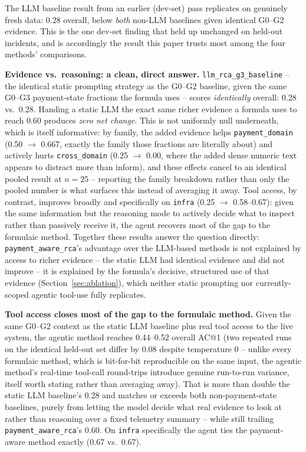 \documentclass[conference]{IEEEtran}
\begin{document}
The LLM baseline result from an earlier (dev-set) pass replicates on
genuinely fresh data: 0.28 overall, below \emph{both} non-LLM baselines
given identical G0--G2 evidence. This is the one dev-set finding that
held up unchanged on held-out incidents, and is accordingly the result
this paper trusts most among the four methods' comparisons.

\textbf{Evidence vs.\ reasoning: a clean, direct answer.}
\texttt{llm\_rca\_g3\_baseline} -- the identical static prompting strategy
as the G0--G2 baseline, given the same G0--G3 payment-state fractions the
formula uses -- scores \emph{identically} overall: 0.28 vs.\ 0.28. Handing
a static LLM the exact same richer evidence a formula uses to reach 0.60
produces \emph{zero net change}. This is not uniformly null underneath,
which is itself informative: by family, the added evidence helps
\texttt{payment\_domain} (0.50 $\to$ 0.667, exactly the family those
fractions are literally about) and actively hurts \texttt{cross\_domain}
(0.25 $\to$ 0.00, where the added dense numeric text appears to distract
more than inform), and these effects cancel to an identical pooled result
at $n=25$ -- reporting the family breakdown rather than only the pooled
number is what surfaces this instead of averaging it away. Tool access,
by contrast, improves broadly and specifically on \texttt{infra} (0.25 $\to$
0.58--0.67): given the same information but the reasoning mode to actively
decide what to inspect rather than passively receive it, the agent
recovers most of the gap to the formulaic method. Together these results
answer the question directly: \texttt{payment\_aware\_rca}'s advantage over
the LLM-based methods is not explained by access to richer evidence -- the
static LLM had identical evidence and did not improve -- it is explained
by the formula's decisive, structured use of that evidence
(Section~\ref{sec:ablation}), which neither static prompting nor
currently-scoped agentic tool-use fully replicates.

\textbf{Tool access closes most of the gap to the formulaic method.} Given
the same G0--G2 context as the static LLM baseline plus real tool access
to the live system, the agentic method reaches 0.44--0.52 overall AC@1
(two repeated runs on the identical held-out set differ by 0.08 despite
temperature 0 -- unlike every formulaic method, which is bit-for-bit
reproducible on the same input, the agentic method's real-time tool-call
round-trips introduce genuine run-to-run variance, itself worth stating
rather than averaging away). That is more than double the static LLM
baseline's 0.28 and matches or exceeds both non-payment-state baselines,
purely from letting the model decide what real evidence to look at rather
than reasoning over a fixed telemetry summary -- while still trailing
\texttt{payment\_aware\_rca}'s 0.60. On \texttt{infra} specifically the
agent ties the payment-aware method exactly (0.67 vs.\ 0.67).
\end{document}
